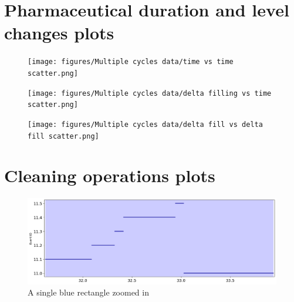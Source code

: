 \documentclass[../Thesis.tex]{subfiles}
\begin{document}
\newpage

\section{Pharmaceutical duration and level changes plots}
\begin{figure}[H]
    \centering
    \texttt{[image: figures/Multiple cycles data/time vs time scatter.png]}
    \caption{}
    \label{fig:time vs time all}
\end{figure}

\begin{figure}[H]
    \centering
    \texttt{[image: figures/Multiple cycles data/delta filling vs time scatter.png]}
    \caption{}
    \label{fig:time vs level all}
\end{figure}

\begin{figure}[H]
    \centering
    \texttt{[image: figures/Multiple cycles data/delta fill vs delta fill scatter.png]}
    \caption{}
    \label{fig:level vs level all}
\end{figure}

\newpage

\section{Cleaning operations plots}
\begin{figure}[H]
    \centering
    \includegraphics[width=0.9\linewidth]{figures/Multiple cycles data/Cleaning batches timeseries single.png}
    \caption{A single blue rectangle zoomed in}
    \label{fig:cycle cleaning time series single}
\end{figure}
\end{document}
